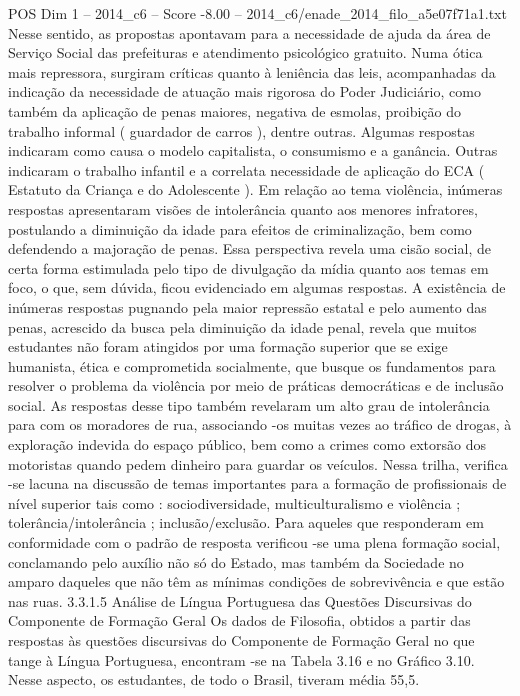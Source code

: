\begin{textsample}{POS Dim 1 – 2014\_c6 – Score -8.00 – 2014\_c6/enade\_2014\_filo\_a5e07f71a1.txt}
Nesse sentido, as propostas apontavam para a necessidade de ajuda da área de Serviço Social das prefeituras e atendimento psicológico gratuito.
Numa ótica mais repressora, surgiram críticas quanto à leniência das leis, acompanhadas da indicação da necessidade de atuação mais rigorosa do Poder Judiciário, como também da aplicação de penas maiores, negativa de esmolas, proibição do trabalho informal ( guardador de carros ), dentre outras.
Algumas respostas indicaram como causa o modelo capitalista, o consumismo e a ganância.
Outras indicaram o trabalho infantil e a correlata necessidade de aplicação do ECA ( Estatuto da Criança e do Adolescente ).
Em relação ao tema violência, inúmeras respostas apresentaram visões de intolerância quanto aos menores infratores, postulando a diminuição da idade para efeitos de criminalização, bem como defendendo a majoração de penas.
Essa perspectiva revela uma cisão social, de certa forma estimulada pelo tipo de divulgação da mídia quanto aos temas em foco, o que, sem dúvida, ficou evidenciado em algumas respostas.
A existência de inúmeras respostas pugnando pela maior repressão estatal e pelo aumento das penas, acrescido da busca pela diminuição da idade penal, revela que muitos estudantes não foram atingidos por uma formação superior que se exige humanista, ética e comprometida socialmente, que busque os fundamentos para resolver o problema da violência por meio de práticas democráticas e de inclusão social.
As respostas desse tipo também revelaram um alto grau de intolerância para com os moradores de rua, associando -os muitas vezes ao tráfico de drogas, à exploração indevida do espaço público, bem como a crimes como extorsão dos motoristas quando pedem dinheiro para guardar os veículos.
Nessa trilha, verifica -se lacuna na discussão de temas importantes para a formação de profissionais de nível superior tais como : sociodiversidade, multiculturalismo e violência ; tolerância/intolerância ; inclusão/exclusão.
Para aqueles que responderam em conformidade com o padrão de resposta verificou -se uma plena formação social, conclamando pelo auxílio não só do Estado, mas também da Sociedade no amparo daqueles que não têm as mínimas condições de sobrevivência e que estão nas ruas. 3.3.1.5 Análise de Língua Portuguesa das Questões Discursivas do Componente de Formação Geral Os dados de Filosofia, obtidos a partir das respostas às questões discursivas do Componente de Formação Geral no que tange à Língua Portuguesa, encontram -se na Tabela 3.16 e no Gráfico 3.10.
Nesse aspecto, os estudantes, de todo o Brasil, tiveram média 55,5.

\end{textsample}
